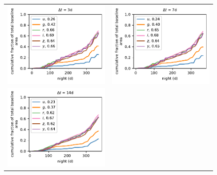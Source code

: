 \documentclass[preprintm,linenumbers]{aastex631}
\begin{document}
		\begin{figure}
			\centering
			\begin{tabular}{@{}c@{}c@{}}
				\includegraphics{results/first_year_one_snap_v4_0_10yrs_db_noDD_noTwi_cumFrac_baseline_3.pdf} &
				\includegraphics{results/first_year_one_snap_v4_0_10yrs_db_noDD_noTwi_cumFrac_baseline_7.pdf} \\
				\includegraphics{results/first_year_one_snap_v4_0_10yrs_db_noDD_noTwi_cumFrac_baseline_14.pdf} &

\end{tabular}
\end{figure}
\end{document}
